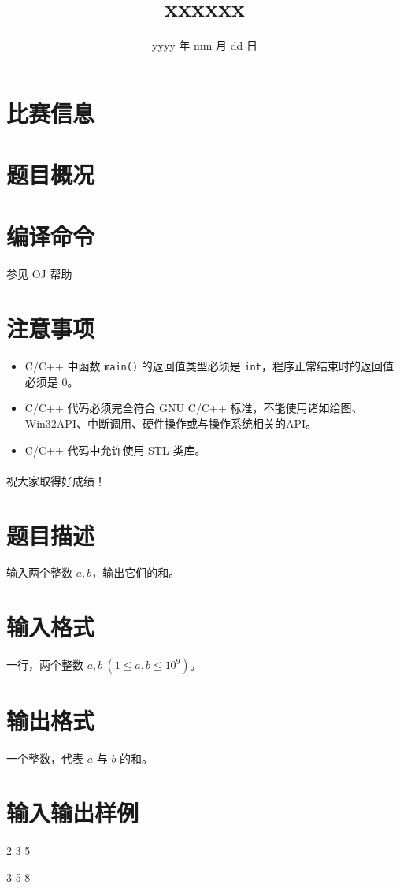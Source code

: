 \documentclass{ctpro}
\title{xxxxxx}
\date{yyyy 年 mm 月 dd 日}
\begin{document}
\maketitle
{}

\section*{比赛信息}


\section*{题目概况}

\problemtab

\section*{编译命令}

参见 OJ 帮助

\section*{注意事项}

\begin{itemize}
    \item C/C++ 中函数 \verb|main()| 的返回值类型必须是 \verb|int|，程序正常结束时的返回值必须是 $0$。
    \item C/C++ 代码必须完全符合 GNU C/C++ 标准，不能使用诸如绘图、Win32API、中断调用、硬件操作或与操作系统相关的API。
    \item C/C++ 代码中允许使用 STL 类库。
\end{itemize}

\paragraph*{} 祝大家取得好成绩！

\makeproblem
\section*{题目描述}

输入两个整数 $a,b$，输出它们的和。

\section*{输入格式}

一行，两个整数 $a,b~(1 \leq a,b \leq {10}^9)$。

\section*{输出格式}

一个整数，代表 $a$ 与 $b$ 的和。

\section*{输入输出样例}

\testcasetab
{
    2 3
}
{
    5
}

\testcasetab
{
    3 5
}
{
    8
}
\end{document}
